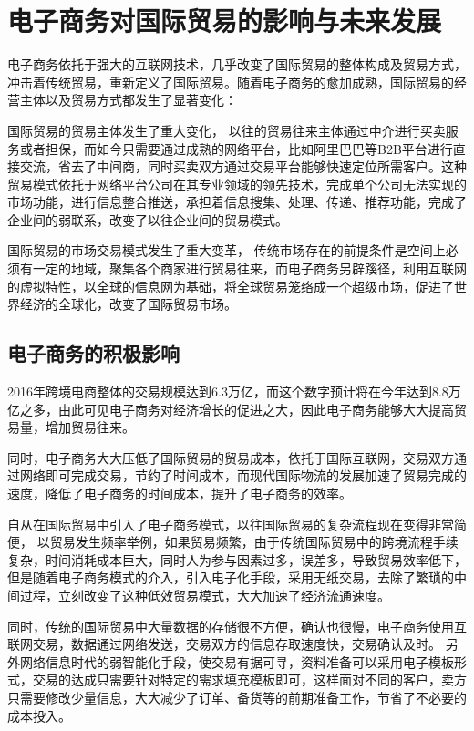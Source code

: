 \chapter{电子商务对国际贸易的影响与未来发展}
电子商务依托于强大的互联网技术，几乎改变了国际贸易的整体构成及贸易方式，冲击着传统贸易，重新定义了国际贸易。随着电子商务的愈加成熟，国际贸易的经营主体以及贸易方式都发生了显著变化：

国际贸易的贸易主体发生了重大变化，
以往的贸易往来主体通过中介进行买卖服务或者担保，而如今只需要通过成熟的网络平台，比如阿里巴巴等B2B平台进行直接交流，省去了中间商，同时买卖双方通过交易平台能够快速定位所需客户。这种贸易模式依托于网络平台公司在其专业领域的领先技术，完成单个公司无法实现的市场功能，进行信息整合推送，承担着信息搜集、处理、传递、推荐功能，完成了企业间的弱联系，改变了以往企业间的贸易模式\cite{zhuyahui2013}。

国际贸易的市场交易模式发生了重大变革，
传统市场存在的前提条件是空间上必须有一定的地域，聚集各个商家进行贸易往来，而电子商务另辟蹊径，利用互联网的虚拟特性，以全球的信息网为基础，将全球贸易笼络成一个超级市场，促进了世界经济的全球化，改变了国际贸易市场。

\section{电子商务的积极影响}
2016年跨境电商整体的交易规模达到6.3万亿，而这个数字预计将在今年达到8.8万亿之多，由此可见电子商务对经济增长的促进之大，因此电子商务能够大大提高贸易量，增加贸易往来。

同时，电子商务大大压低了国际贸易的贸易成本，依托于国际互联网，交易双方通过网络即可完成交易，节约了时间成本，而现代国际物流的发展加速了贸易完成的速度，降低了电子商务的时间成本，提升了电子商务的效率。

自从在国际贸易中引入了电子商务模式，以往国际贸易的复杂流程现在变得非常简便，
以贸易发生频率举例，如果贸易频繁，由于传统国际贸易中的跨境流程手续复杂，时间消耗成本巨大，同时人为参与因素过多，误差多，导致贸易效率低下，
但是随着电子商务模式的介入，引入电子化手段，采用无纸交易，去除了繁琐的中间过程，立刻改变了这种低效贸易模式，大大加速了经济流通速度。

同时，传统的国际贸易中大量数据的存储很不方便，确认也很慢，电子商务使用互联网交易，数据通过网络发送，交易双方的信息存取速度快，交易确认及时。
另外网络信息时代的弱智能化手段，使交易有据可寻，资料准备可以采用电子模板形式，交易的达成只需要针对特定的需求填充模板即可，这样面对不同的客户，卖方只需要修改少量信息，大大减少了订单、备货等的前期准备工作，节省了不必要的成本投入。

